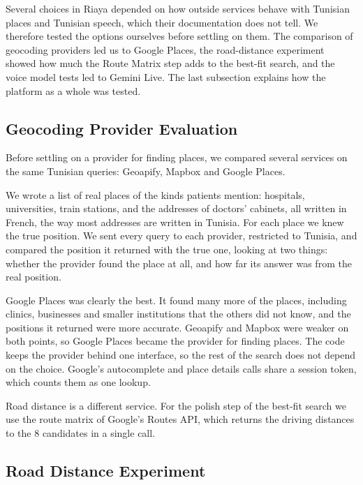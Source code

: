 Several choices in Riaya depended on how outside services behave with Tunisian places and Tunisian speech, which their documentation does not tell. We therefore tested the options ourselves before settling on them. The comparison of geocoding providers led us to Google Places, the road-distance experiment showed how much the Route Matrix step adds to the best-fit search, and the voice model tests led to Gemini Live. The last subsection explains how the platform as a whole was tested.

\subsection{Geocoding Provider Evaluation}
\label{subsec:geocoding-evaluation}

Before settling on a provider for finding places, we compared several services on the same Tunisian queries: Geoapify, Mapbox and Google Places.

We wrote a list of real places of the kinds patients mention: hospitals, universities, train stations, and the addresses of doctors' cabinets, all written in French, the way most addresses are written in Tunisia. For each place we knew the true position. We sent every query to each provider, restricted to Tunisia, and compared the position it returned with the true one, looking at two things: whether the provider found the place at all, and how far its answer was from the real position.

Google Places was clearly the best. It found many more of the places, including clinics, businesses and smaller institutions that the others did not know, and the positions it returned were more accurate. Geoapify and Mapbox were weaker on both points, so Google Places became the provider for finding places. The code keeps the provider behind one interface, so the rest of the search does not depend on the choice. Google's autocomplete and place details calls share a session token, which counts them as one lookup.

Road distance is a different service. For the polish step of the best-fit search we use the route matrix of Google's Routes API, which returns the driving distances to the 8 candidates in a single call.

\subsection{Road Distance Experiment}
\label{subsec:road-distance-experiment}

